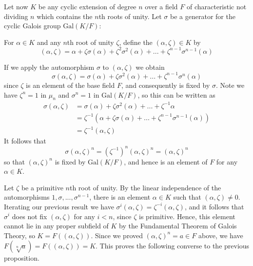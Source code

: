 \documentclass[12pt, a4paper, oneside, openright, titlepage]{book}
\begin{document}
Let now $K$ be any cyclic extension of degree $n$ over a field $F$ of characteristic not dividing $n$ which contains the $n$th roots of unity. Let $\sigma$ be a generator for the cyclic Galois group $\text{Gal}(K/F)$:

\begin{defn}
    For $\alpha \in K$ and any $n$th root of unity $\zeta$, define the  $(\alpha,\zeta) \in K$ by \begin{equation*}
        (\alpha,\zeta) = \alpha+\zeta\sigma(\alpha) +\zeta^2\sigma^2(\alpha)+...+\zeta^{n-1}\sigma^{n-1}(\alpha)
    \end{equation*}
\end{defn}

If we apply the automorphism $\sigma$ to $(\alpha,\zeta)$ we obtain\begin{equation*}
    \sigma(\alpha,\zeta) = \sigma(\alpha)+\zeta\sigma^2(\alpha)+...+\zeta^{n-1}\sigma^n(\alpha)
\end{equation*}
since $\zeta$ is an element of the base field $F$, and consequently is fixed by $\sigma$. Note we have $\zeta^n = 1$ in $\mu_n$ and $\sigma^n = 1$ in $\text{Gal}(K/F)$, so this can be written as \begin{align*}
    \sigma(\alpha,\zeta) &= \sigma(\alpha)+\zeta\sigma^2(\alpha)+...+\zeta^{-1}\alpha \\
    &= \zeta^{-1}(\alpha+\zeta\sigma(\alpha)+...+\zeta^{n-1}\sigma^{n-1}(\alpha)) \\
    &= \zeta^{-1}(\alpha,\zeta)
\end{align*}
It follows that \begin{equation*}
    \sigma(\alpha,\zeta)^n = (\zeta^{-1})^n(\alpha,\zeta)^n = (\alpha,\zeta)^n
\end{equation*}
so that $(\alpha,\zeta)^n$ is fixed by $\text{Gal}(K/F)$, and hence is an element of $F$ for any $\alpha \in K$.

Let $\zeta$ be a primitive $n$th root of unity. By the linear independence of the automorphisms $1,\sigma,...,\sigma^{n-1}$, there is an element $\alpha \in K$ such that $(\alpha,\zeta)\neq 0$. Iterating our previous result we have $\sigma^i(\alpha,\zeta) = \zeta^{-i}(\alpha,\zeta)$, and it follows that $\sigma^i$ does not fix $(\alpha,\zeta)$ for any $i < n$, since $\zeta$ is primitive. Hence, this element cannot lie in any proper subfield of $K$ by the Fundamental Theorem of Galois Theory, so $K = F((\alpha,\zeta))$. Since we proved $(\alpha,\zeta)^n = a \in F$ above, we have $F(\sqrt[n]{a}) = F((\alpha,\zeta)) = K$. This proves the following converse to the previous proposition.
\end{document}
